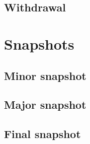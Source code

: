 \documentclass[../hydrozoa.tex]{subfiles}
\begin{document}

\subsection{Withdrawal}%
\label{h:consensus-withdrawal}


\section{Snapshots}%
\label{h:consensus-snapshots}

\subsection{Minor snapshot}%
\label{h:consensus-minor-snapshot}



\subsection{Major snapshot}%
\label{h:consensus-major-snapshot}



\subsection{Final snapshot}%
\label{h:consensus-final-snapshot}


\end{document}
